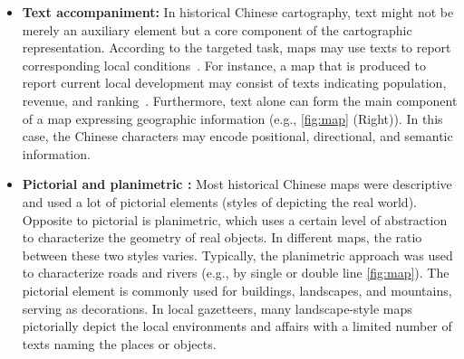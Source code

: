 \begin{itemize}[leftmargin=3.5mm]
    \item \textbf{Text accompaniment:}
          In historical Chinese cartography, text might not be merely an auxiliary element but a core component of the cartographic representation.
          According to the targeted task, maps may use texts to report corresponding local conditions~\cite{Yee1994Reinterpreting}.
          For instance, a map that is produced to report current local development may consist of texts indicating population, revenue, and ranking~\cite{Osawa2016Landscape}.
          Furthermore, text alone can form the main component of a map expressing geographic information (e.g., \cref{fig:map} (Right)).
          In this case, the Chinese characters may encode positional, directional, and semantic information.

          \item \textbf{Pictorial and planimetric :}
          Most historical Chinese maps were descriptive and used a lot of pictorial elements (styles of depicting the real world).
          Opposite to pictorial is planimetric, which uses a certain level of abstraction to characterize the geometry of real objects.
          In different maps, the ratio between these two styles varies.
          Typically, the planimetric approach was used to characterize roads and rivers (e.g., by single or double line \cref{fig:map}).
          The pictorial element is commonly used for buildings, landscapes, and mountains, serving as decorations.
          In local gazetteers, many landscape-style maps pictorially depict the local environments and affairs with a limited number of texts naming the places or objects. 


\end{itemize}
